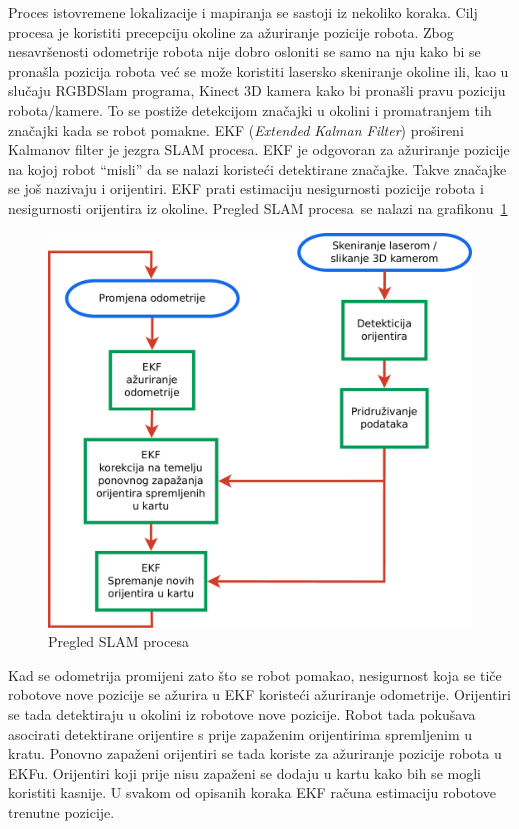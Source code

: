 Proces istovremene lokalizacije i mapiranja se sastoji iz nekoliko
koraka. Cilj procesa je koristiti precepciju okoline za ažuriranje
pozicije robota.  Zbog nesavršenosti odometrije robota nije dobro
osloniti se samo na nju kako bi se pronašla pozicija robota već se može
koristiti lasersko skeniranje okoline ili, kao u slučaju RGBDSlam
programa, Kinect 3D kamera kako bi pronašli pravu poziciju
robota/kamere. To se postiže detekcijom značajki u okolini i
promatranjem tih značajki kada se robot pomakne. EKF (\textit{Extended
Kalman Filter}) prošireni Kalmanov filter je jezgra SLAM procesa. EKF je
odgovoran za ažuriranje pozicije na kojoj robot ``misli'' da se nalazi
koristeći detektirane značajke. Takve značajke se još nazivaju i
orijentiri. EKF prati estimaciju nesigurnosti pozicije robota i
nesigurnosti orijentira iz okoline. Pregled SLAM
procesa~\footnotemark[1] se nalazi na
grafikonu~\ref{fig:slam-overview.pdf}  


\begin{figure}[h]
\renewcommand{\figurename}{Grafikon}
\centering
\includegraphics[scale=0.4]{figures/slam-overview.pdf}
\caption{Pregled SLAM procesa}
\label{fig:slam-overview.pdf}
\end{figure}

Kad se odometrija promijeni zato što se robot pomakao, nesigurnost koja
se tiče robotove nove pozicije se ažurira u EKF koristeći ažuriranje
odometrije. Orijentiri se tada detektiraju u okolini iz robotove nove
pozicije. Robot tada pokušava asocirati detektirane orijentire s prije
zapaženim orijentirima spremljenim u kratu. Ponovno zapaženi orijentiri
se tada koriste za ažuriranje pozicije robota u EKFu. Orijentiri koji
prije nisu zapaženi se dodaju u kartu kako bih se mogli koristiti
kasnije. U svakom od opisanih koraka EKF računa estimaciju robotove
trenutne pozicije. 

